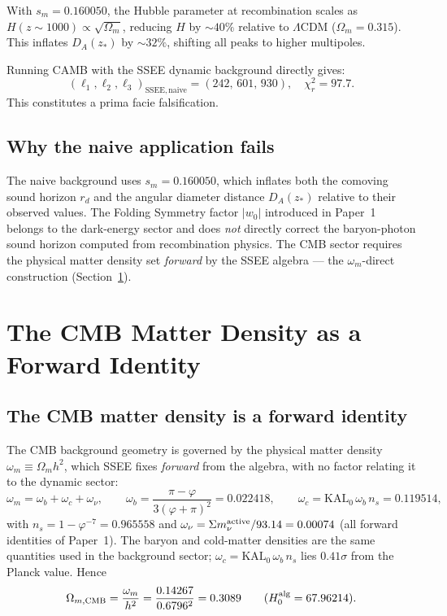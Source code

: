 \documentclass[12pt,a4paper]{article}
\begin{document}
With $s_m=0.160050$, the Hubble parameter at recombination scales as
$H(z\sim1000)\propto\sqrt{\Omega_m}$, reducing $H$ by $\sim40\%$ relative to
$\Lambda$CDM ($\Omega_m=0.315$).
This inflates $D_A(z_*)$ by $\sim32\%$, shifting all peaks to higher multipoles.

Running CAMB with the SSEE dynamic background directly gives:
\begin{equation}
(\ell_1,\ell_2,\ell_3)_{\mathrm{SSEE,naive}} = (242,\,601,\,930),
\quad \chi^2_r = 97.7.
\end{equation}
This constitutes a prima facie falsification.

\subsection{Why the naive application fails}

The naive background uses $s_m=0.160050$, which inflates both the comoving
sound horizon $r_d$ and the angular diameter distance $D_A(z_*)$ relative to
their observed values.  The Folding Symmetry factor $|w_0|$ introduced in
Paper~1 belongs to the dark-energy sector and does \emph{not} directly correct
the baryon-photon sound horizon computed from recombination physics.  The CMB
sector requires the physical matter density set \emph{forward} by the SSEE
algebra — the $\omega_m$-direct construction (Section~\ref{sec:mira}).

\section{The CMB Matter Density as a Forward Identity}
\label{sec:mira}

\subsection{The CMB matter density is a forward identity}

The CMB background geometry is governed by the physical matter density
$\omega_m\equiv\Omega_m h^2$, which SSEE fixes \emph{forward} from the algebra,
with no factor relating it to the dynamic sector:
\begin{equation}
  \omega_m = \omega_b + \omega_c + \omega_\nu, \qquad
  \omega_b = \frac{\pi-\varphi}{3(\varphi+\pi)^2} = 0.022418, \qquad
  \omega_c = \mathrm{KAL}_0\,\omega_b\,n_s = 0.119514,
  \label{eq:omega_m_direct}
\end{equation}
with $n_s=1-\varphi^{-7}=0.965558$ and $\omega_\nu=\Sigma m_\nu^{\rm active}/93.14=0.00074$
(all forward identities of Paper~1). The baryon and cold-matter densities are the same
quantities used in the background sector; $\omega_c=\mathrm{KAL}_0\,\omega_b\,n_s$ lies
$0.41\sigma$ from the Planck value. Hence
\begin{equation}
  \Omega_{m,\mathrm{CMB}} = \frac{\omega_m}{h^2} = \frac{0.14267}{0.6796^2} = 0.3089
  \qquad (H_0^{\rm alg} = 67.96214).
\end{equation}
\end{document}
